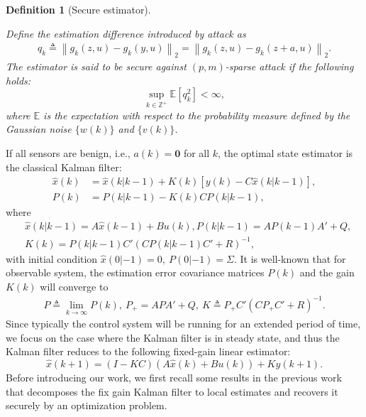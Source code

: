 \documentclass[12pt]{article}  %
\newcommand{\Eb}{{\mathbb{E}}}
\newcommand{\Zb}{{\mathbb{Z}}}
\newcommand{\ift}{{\infty}}
\newtheorem{definition}{\textbf{Definition}}
\begin{document}
\begin{definition}[Secure estimator]\label{def:resi}
	
	Define the estimation difference introduced by attack as
	\begin{align*}
	q_k\triangleq \left\|g_k\left(z,u\right)-g_k\left(y,u\right) \right\|_2 
	=\left\|g_k\left(z,u\right)-g_k\left(z+a,u\right) \right\|_2 .
	\end{align*}
	The estimator is said to be secure against $(p, m)$-sparse attack if the following holds:
	$$\sup_{k\in\Zb^+} \Eb \left[q_k^2\right] < \ift ,$$
	where $\Eb$ is the expectation with respect to the probability measure defined by the Gaussian noise $\{w(k)\}$ and $\{v(k)\}$.
\end{definition}
If all sensors are benign, i.e., $a(k)=\mathbf{0}$ for all $k$, the optimal state estimator is the classical Kalman filter:
\begin{align*}
	\hat{x}(k)&=\hat{x}(k | k-1)+K(k)\left[y(k)-C \hat{x}(k  | k-1)\right] ,\\
	P(k)&=P(k  | k-1)-K(k) C P(k  | k-1),
\end{align*}
where
\begin{align*}
	&\hat{x}(k  | k-1)=A \hat{x}(k-1)+Bu(k), P(k  | k-1)=A P(k-1) A{'}+Q ,\\	
	&K(k)=P(k  | k-1) C{'}\left(C P(k  | k-1) C{'}+R\right)^{-1},
\end{align*}
with initial condition $\hat{x}(0  |-1)=0,\ P(0  |-1)=\Sigma $.
It is well-known that for observable system, the estimation error covariance matrices $P(k)$ and the gain $K(k)$ will converge to
\begin{align*}
	P \triangleq \lim _{k \rightarrow \infty} P(k),\ P_{+}=A P A{'}+Q ,\ K \triangleq P_{+} C{'}\left(C P_{+} C{'}+R\right)^{-1}.
\end{align*}
Since typically the control system will be running for an extended period of time, we focus on the case where the Kalman filter is in steady state, and thus the Kalman filter reduces to the following fixed-gain linear estimator:
\begin{equation}\label{eq:fix_gain_kalman}
	\hat{x}(k+1)=(I-K C) \left(A \hat{x}(k)+Bu(k)\right)+K y(k+1) .
\end{equation}
Before introducing our work, we first recall some results in the previous work that decomposes the fix gain Kalman filter to local estimates and recovers it securely by an optimization problem. %
\end{document}
